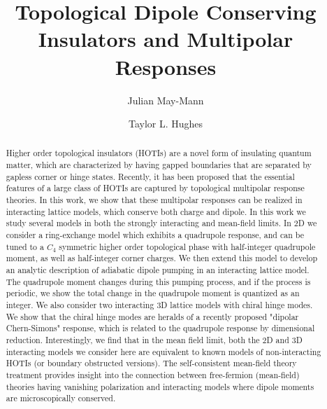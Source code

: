 \documentclass[prb,aps,twocolumn,groupaddress,floatfix]{revtex4-1}
\begin{document}
\title{Topological Dipole Conserving Insulators and Multipolar Responses}
\author{Julian May-Mann} 
\author{Taylor L. Hughes} 



\begin{abstract}{Higher order topological insulators (HOTIs) are a novel form of insulating quantum matter, which are characterized by having gapped boundaries that are separated by gapless corner or hinge states. Recently, it has been proposed that the essential features of a large class of HOTIs are captured by topological multipolar response theories. In this work, we show that these multipolar responses can be realized in interacting lattice models, which conserve both charge and dipole. In this work we study several models in both the strongly interacting and mean-field limits. In $2$D we consider a ring-exchange model which exhibits a quadrupole response, and can be tuned to a $C_4$ symmetric higher order topological phase with half-integer quadrupole moment, as well as half-integer corner charges. We then extend this model to develop an analytic description of adiabatic dipole pumping in an interacting lattice model. The quadrupole moment changes during this pumping process, and if the process is periodic, we show the total change in the quadrupole moment is quantized as an integer. We also consider two interacting $3$D lattice models with chiral hinge modes. We show that the chiral hinge modes are heralds of a recently proposed "dipolar Chern-Simons" response, which is related to the quadrupole response by dimensional reduction. Interestingly, we find that in the mean field limit, both the $2$D and $3$D interacting models we consider here are equivalent to known models of non-interacting HOTIs (or boundary obstructed versions). The self-consistent mean-field theory treatment provides insight into the connection between free-fermion (mean-field) theories having vanishing polarization and interacting models where dipole moments are microscopically conserved. }


\end{abstract}
\maketitle
\tableofcontents
\end{document}
